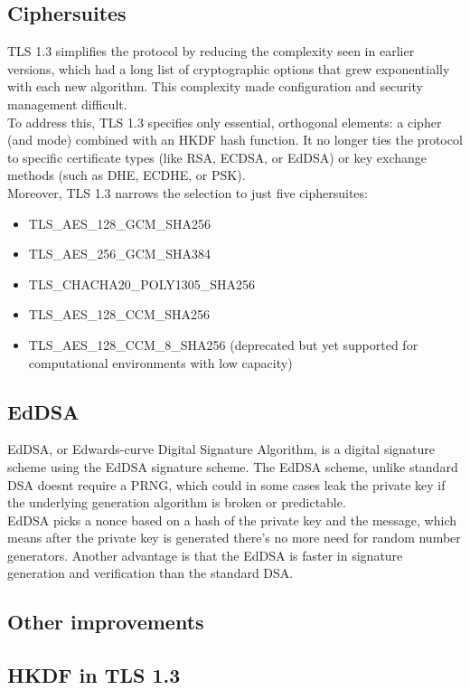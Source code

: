 \subsection{Ciphersuites}
TLS 1.3 simplifies the protocol by reducing the complexity seen in
earlier versions, which had a long list of cryptographic options that
grew exponentially with each new algorithm. This complexity made
configuration and security management difficult.\\
To address this, TLS 1.3 specifies only essential, orthogonal
elements: a cipher (and mode) combined with an HKDF hash function. It
no longer ties the protocol to specific certificate types (like RSA,
ECDSA, or EdDSA) or key exchange methods (such as DHE, ECDHE, or
PSK).\\
Moreover, TLS 1.3 narrows the selection to just five ciphersuites:
\begin{itemize}
  \item TLS\_AES\_128\_GCM\_SHA256
  \item TLS\_AES\_256\_GCM\_SHA384
  \item TLS\_CHACHA20\_POLY1305\_SHA256
  \item TLS\_AES\_128\_CCM\_SHA256
  \item TLS\_AES\_128\_CCM\_8\_SHA256 (deprecated but yet supported
    for computational environments with low capacity)
\end{itemize}

\subsection{EdDSA}
EdDSA, or Edwards-curve Digital Signature Algorithm, is a digital 
signature scheme using the EdDSA signature scheme. The EdDSA scheme,
unlike standard DSA doesnt require a PRNG, which could in some cases
leak the private key if the underlying generation algorithm is broken
or predictable.\\
EdDSA picks a nonce based on a hash of the private key and the
message, which means after the private key is generated there’s no
more need for random number generators. Another advantage is that the
EdDSA is faster in signature generation and verification than the
standard DSA.


\subsection{Other improvements}

\subsection{HKDF in TLS 1.3}

